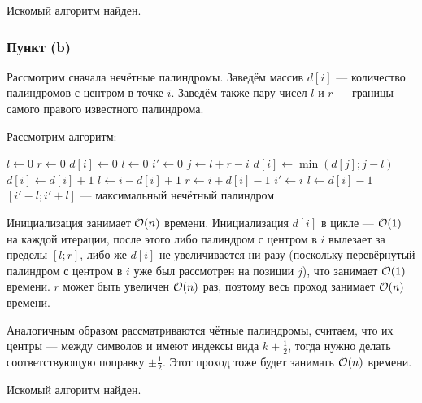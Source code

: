Искомый алгоритм найден.

\subsubsection{Пункт (b)}
Рассмотрим сначала нечётные палиндромы.
Заведём массив $d[i]$ --- количество палиндромов с центром в точке $i$.
Заведём также пару чисел $l$ и $r$ --- границы самого правого известного палиндрома.

Рассмотрим алгоритм:
\begin{algorithmic}
    \State $l \gets 0$
    \State $r \gets 0$
        \State $d[i] \gets 0$
    \EndFor
    \State $l \gets 0$
    \State $i' \gets 0$
            \State $j \gets l + r - i$
            \State $d[i] \gets \min(d[j]; j - l)$
        \EndIf
            \State $d[i] \gets d[i] + 1$
        \EndWhile
            \State $l \gets i - d[i] + 1$
            \State $r \gets i + d[i] - 1$
        \EndIf
            \State $i' \gets i$
            \State $l \gets d[i] - 1$
        \EndIf
    \EndFor
    \State $[i' - l; i' + l]$ --- максимальный нечётный палиндром
\end{algorithmic}

Инициализация занимает $\mathcal{O}(n)$ времени.
Инициализация $d[i]$ в цикле --- $\mathcal{O}(1)$ на каждой итерации,
после этого либо палиндром с центром в $i$ вылезает за пределы $[l; r]$,
либо же $d[i]$ не увеличивается ни разу
(поскольку перевёрнутый палиндром с центром в $i$ уже был рассмотрен на позиции $j$),
что занимает $\mathcal{O}(1)$ времени.
$r$ может быть увеличен $\mathcal{O}(n)$ раз, поэтому весь проход занимает $\mathcal{O}(n)$ времени.

Аналогичным образом рассматриваются чётные палиндромы,
считаем, что их центры --- между символов и имеют индексы вида $k + \frac{1}{2}$,
тогда нужно делать соответствующую поправку $\pm \frac{1}{2}$.
Этот проход тоже будет занимать $\mathcal{O}(n)$ времени.

Искомый алгоритм найден.
